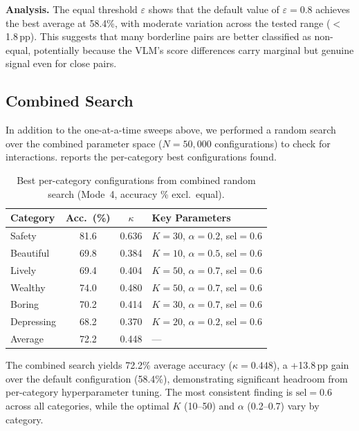 \documentclass[runningheads]{llncs}
\begin{document}
\noindent\textbf{Analysis.}
The equal threshold $\varepsilon$ shows that the default value of $\varepsilon{=}0.8$ achieves the best average at 58.4\%, with moderate variation across the tested range ($<$1.8\,pp).
This suggests that many borderline pairs are better classified as non-equal, potentially because the VLM's score differences carry marginal but genuine signal even for close pairs.

\subsection{Combined Search}

In addition to the one-at-a-time sweeps above, we performed a random search over the combined parameter space ($N{=}50{,}000$ configurations) to check for interactions.
 reports the per-category best configurations found.

\begin{table}[H]
\centering
\caption{Best per-category configurations from combined random search (Mode~4, accuracy \% excl.\ equal).}
\label{tab:combined_sweep}
\small
\setlength{\tabcolsep}{4pt}
\begin{tabular}{lccl}
\toprule
Category & Acc.\ (\%) & $\kappa$ & Key Parameters \\
\midrule
Safety      & 81.6 & 0.636 & $K{=}30$, $\alpha{=}0.2$, sel${=}0.6$ \\
Beautiful   & 69.8 & 0.384 & $K{=}10$, $\alpha{=}0.5$, sel${=}0.6$ \\
Lively      & 69.4 & 0.404 & $K{=}50$, $\alpha{=}0.7$, sel${=}0.6$ \\
Wealthy     & 74.0 & 0.480 & $K{=}50$, $\alpha{=}0.7$, sel${=}0.6$ \\
Boring      & 70.2 & 0.414 & $K{=}30$, $\alpha{=}0.7$, sel${=}0.6$ \\
Depressing  & 68.2 & 0.370 & $K{=}20$, $\alpha{=}0.2$, sel${=}0.6$ \\
\midrule
Average     & 72.2 & 0.448 & --- \\
\bottomrule
\end{tabular}
\end{table}

\noindent The combined search yields 72.2\% average accuracy ($\kappa{=}0.448$), a +13.8\,pp gain over the default configuration (58.4\%), demonstrating significant headroom from per-category hyperparameter tuning. The most consistent finding is $\text{sel}{=}0.6$ across all categories, while the optimal $K$ (10--50) and $\alpha$ (0.2--0.7) vary by category.
\end{document}
